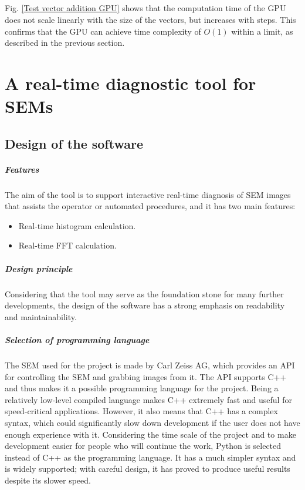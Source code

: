 \documentclass[12pt, twocolumn]{report}
\begin{document}
\paragraph{}
Fig. \ref{Test vector addition GPU} shows that the computation time of the GPU does not scale linearly with the size of the vectors, but increases with steps. This confirms that the GPU can achieve time complexity of $O(1)$ within a limit, as described in the previous section.

\chapter{A real-time diagnostic tool for SEMs}
\section{Design of the software}
\paragraph{Features}
The aim of the tool is to support interactive real-time diagnosis of SEM images that assists the operator or automated procedures, and it has two main features:
\begin{itemize}
    \item Real-time histogram calculation.
    \item Real-time FFT calculation.
\end{itemize}

\paragraph{Design principle}
Considering that the tool may serve as the foundation stone for many further developments, the design of the software has a strong emphasis on readability and maintainability.

\paragraph{Selection of programming language}
The SEM used for the project is made by Carl Zeiss AG, which provides an API for controlling the SEM and grabbing images from it. The API supports C++ and thus makes it a possible programming language for the project. Being a relatively low-level compiled language makes C++ extremely fast and useful for speed-critical applications. However, it also means that C++ has a complex syntax, which could significantly slow down development if the user does not have enough experience with it. Considering the time scale of the project and to make development easier for people who will continue the work, Python is selected instead of C++ as the programming language. It has a much simpler syntax and is widely supported; with careful design, it has proved to produce useful results despite its slower speed.
\end{document}
